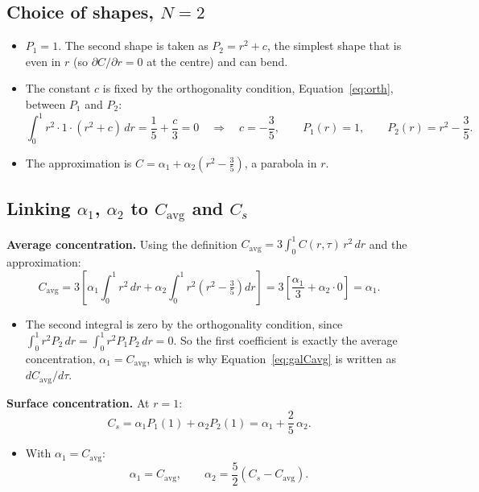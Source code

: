 \documentclass[11pt,a4paper]{article}
\newcommand{\avg}{\mathrm{avg}}
\begin{document}
\subsection{Choice of shapes, $N=2$}
\begin{itemize}
  \item $P_1=1$. The second shape is taken as $P_2=r^2+c$, the simplest shape that is even in $r$ (so $\partial C/\partial r=0$ at the centre) and can bend.
  \item The constant $c$ is fixed by the orthogonality condition, Equation~\eqref{eq:orth}, between $P_1$ and $P_2$:
  \begin{equation}
    \int_0^1 r^2\cdot1\cdot(r^2+c)\,dr = \frac15+\frac c3 = 0\quad\Rightarrow\quad c=-\frac35,\qquad P_1(r)=1,\qquad P_2(r)=r^2-\frac35.
  \end{equation}
  \item The approximation is $C=\alpha_1+\alpha_2\left(r^2-\frac35\right)$, a parabola in $r$.
\end{itemize}

\subsection{Linking $\alpha_1$, $\alpha_2$ to $C_\avg$ and $C_s$}
\textbf{Average concentration.} Using the definition $C_\avg=3\int_0^1C(r,\tau)\,r^2\,dr$ and the approximation:
\begin{equation}
  C_\avg = 3\left[\alpha_1\int_0^1r^2\,dr+\alpha_2\int_0^1r^2\left(r^2-\tfrac35\right)dr\right] = 3\left[\frac{\alpha_1}{3}+\alpha_2\cdot0\right]=\alpha_1.
\end{equation}
\begin{itemize}
  \item The second integral is zero by the orthogonality condition, since $\int_0^1r^2P_2\,dr=\int_0^1r^2P_1P_2\,dr=0$. So the first coefficient is exactly the average concentration, $\alpha_1=C_\avg$, which is why Equation~\eqref{eq:galCavg} is written as $dC_\avg/d\tau$.
\end{itemize}
\textbf{Surface concentration.} At $r=1$:
\begin{equation}
  C_s = \alpha_1P_1(1)+\alpha_2P_2(1) = \alpha_1+\frac25\,\alpha_2.
\end{equation}
\begin{itemize}
  \item With $\alpha_1=C_\avg$:
  \begin{equation}\label{eq:alphas}
    \alpha_1 = C_\avg,\qquad \alpha_2=\frac52\left(C_s-C_\avg\right).
  \end{equation}
\end{itemize}
\end{document}
